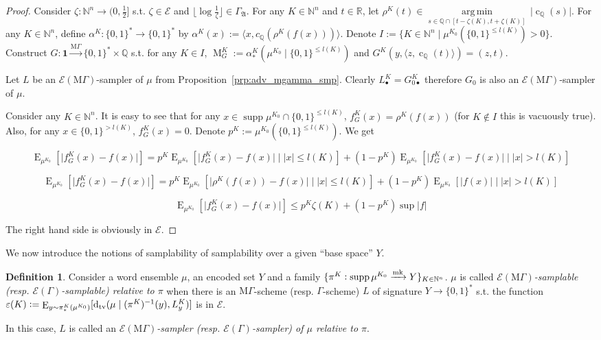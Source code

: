 \documentclass{article}
\numberwithin{equation}{section}
\theoremstyle{definition}
\newtheorem{definition}{Definition}[section]
\theoremstyle{plain}
\newcommand{\Bool}{\{0,1\}}
\newcommand{\Words}{{\Bool^*}}
\DeclareMathOperator{\Supp}{supp}
\DeclareMathOperator{\E}{E}
\DeclareMathOperator{\M}{M}
\DeclareMathOperator{\En}{c}
\newcommand{\Dtv}{\operatorname{d}_{\textnormal{tv}}}
\newcommand{\Argmin}[1]{\underset{#1}{\operatorname{arg\,min}}\,}
\newcommand{\Nats}{\mathbb{N}}
\newcommand{\Rats}{\mathbb{Q}}
\newcommand{\Reals}{\mathbb{R}}
\newcommand{\Abs}[1]{\lvert #1 \rvert}
\newcommand{\Floor}[1]{\lfloor #1 \rfloor}
\newcommand{\Chev}[1]{\langle #1 \rangle}
\newcommand{\GrowA}{\Gamma_{\mathfrak{A}}}
\newcommand{\MGrow}{\mathrm{M}\Gamma}
\newcommand{\Fall}{\mathcal{E}}
\newcommand{\EG}{\Fall(\Gamma)}
\newcommand{\EMG}{\Fall(\MGrow)}
\newcommand{\Markov}{\xrightarrow{\textnormal{mk}}}
\newcommand{\MScheme}{\xrightarrow{\MGrow}}
\begin{document}
\begin{proof}

Consider $\zeta: \Nats^n \rightarrow (0,\frac{1}{2}]$ s.t.  $\zeta \in \Fall$ and $\Floor{\log \frac{1}{\zeta}} \in \GrowA$. For any $K \in \Nats^n$ and $t \in \Reals$, let $\rho^K(t) \in \Argmin{s \in \Rats \cap [t-\zeta(K),t+\zeta(K)]} \Abs{\En_\Rats(s)}$. For any $K \in \Nats^n$, define ${\alpha^K: \Words \rightarrow \Words}$ by $\alpha^K(x):=\Chev{x,c_\Rats(\rho^K(f(x)))}$. Denote ${I:=\{K \in \Nats^n \mid \mu^{K_0}(\Bool^{\leq l(K)}) > 0\}}$. Construct ${G: \bm{1} \MScheme \Words \times \Rats}$ s.t. for any $K \in I$, $\M_G^K:=\alpha_*^K(\mu^{K_0} \mid \Bool^{\leq l(K)})$ and ${G^K(y,\Chev{z,\En_\Rats(t)})=(z,t)}$.

Let $L$ be an $\EMG$-sampler of $\mu$ from Proposition~\ref{prp:adv_mgamma_smp}. Clearly $L_{\bullet}^K=G_{0\bullet}^K$ therefore $G_0$ is also an $\EMG$-sampler of $\mu$.

Consider any $K \in \Nats^n$. It is easy to see that for any ${x \in \Supp \mu^{K_0} \cap \Bool^{\leq l(K)}}$, $f_G^K(x)=\rho^K(f(x))$ (for $K \not\in I$ this is vacuously true). Also, for any ${x \in \Bool^{>l(K)}}$, $f_G^K(x)=0$. Denote ${p^K:=\mu^{K_0}(\Bool^{\leq l(K)})}$. We get

$$\E_{\mu^{K_0}}[\Abs{f_G^K(x)-f(x)}]=p^K \E_{\mu^{K_0}}[\Abs{f_G^K(x)-f(x)} \mid \Abs{x} \leq l(K)] + (1 - p^K)\E_{\mu^{K_0}}[\Abs{f_G^K(x)-f(x)} \mid \Abs{x} > l(K)]$$

$$\E_{\mu^{K_0}}[\Abs{f_G^K(x)-f(x)}]=p^K \E_{\mu^{K_0}}[\Abs{\rho^K(f(x))-f(x)} \mid \Abs{x} \leq l(K)] + (1 - p^K)\E_{\mu^{K_0}}[\Abs{f(x)} \mid \Abs{x} > l(K)]$$

$$\E_{\mu^{K_0}}[\Abs{f_G^K(x)-f(x)}] \leq p^K \zeta(K) + (1 - p^K)\sup \Abs{f}$$

The right hand side is obviously in $\Fall$.
\end{proof}

We now introduce the notions of samplability of samplability over a given \enquote{base space} $Y$.

\begin{definition}

Consider a word ensemble $\mu$, an encoded set $Y$ and a family ${\{\pi^K: \Supp \mu^{K_0} \Markov Y\}_{K \in \Nats^n}}$. $\mu$ is called \emph{$\EMG$-samplable (resp. $\EG$-samplable) relative to $\pi$} when there is an $\MGrow$-scheme (resp. $\Gamma$-scheme) $L$ of signature $Y \rightarrow \Words$ s.t. the function ${\varepsilon(K):=\E_{y \sim \pi_*^K(\mu^{K_0})}[\Dtv(\mu \mid (\pi^K)^{-1}(y),L_y^K)]}$ is in $\Fall$.

In this case, $L$ is called an \emph{$\EMG$-sampler (resp. $\EG$-sampler) of $\mu$ relative to $\pi$}.

\end{definition}
\end{document}
